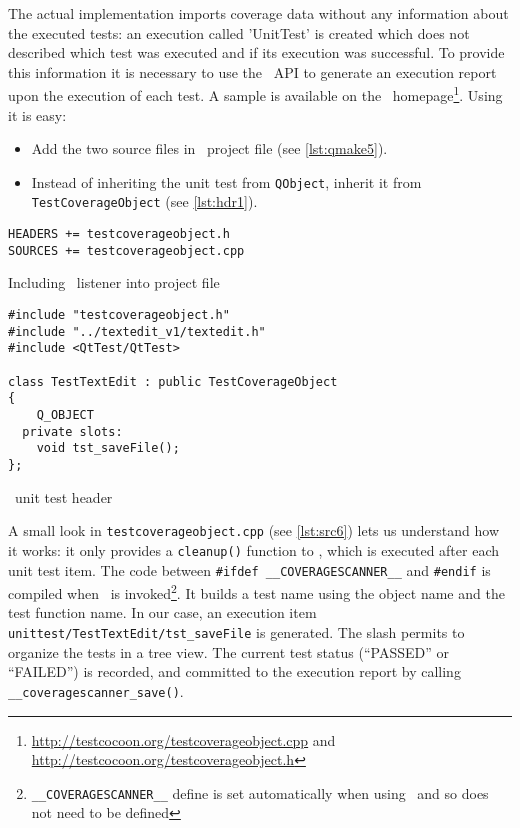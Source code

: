 The actual implementation imports coverage data without any information about
the executed tests: an execution called '\textsf{UnitTest}' is created which does
not described which test was executed and if its execution was successful.
To provide this information it is necessary to use the \CoverageScanner\ API to
generate an execution report upon the execution of each test. A sample is
available on the \TestCocoon\
homepage\footnote{\url{http://testcocoon.org/testcoverageobject.cpp} and
\url{http://testcocoon.org/testcoverageobject.h}}. Using it is easy: 
\begin{itemize}
  \item Add the two source files in \qmake\ project file (see \autoref{lst:qmake5}).
  \item Instead of inheriting the unit test from \texttt{QObject}, inherit it
    from \texttt{TestCoverageObject} (see \autoref{lst:hdr1}).
\end{itemize}

\begin{listings}[H]
  \scriptsize
\begin{verbatim}
HEADERS += testcoverageobject.h
SOURCES += testcoverageobject.cpp
\end{verbatim}
\caption{Including \CoverageScanner\ listener into {\qmake} project file}
\label{lst:qmake5}
\end{listings}

\begin{listings}[H]
  \scriptsize
\begin{verbatim}
#include "testcoverageobject.h"
#include "../textedit_v1/textedit.h"
#include <QtTest/QtTest>

class TestTextEdit : public TestCoverageObject
{
    Q_OBJECT
  private slots:
    void tst_saveFile();
};
\end{verbatim}
\caption{\TextEdit\ unit test header}
\label{lst:hdr1}
\end{listings}

A small look in \texttt{testcoverageobject.cpp} (see \autoref{lst:src6}) lets
us understand how it works: it only provides a \verb$cleanup()$ function to
\QTestLib, which is executed after each unit test item.
The code between \verb$#ifdef __COVERAGESCANNER__$ and \verb$#endif$ is 
compiled when \CoverageScanner\ is invoked\footnote{\texttt{\_\_COVERAGESCANNER\_\_} define
is set automatically when using \CoverageScanner\ and so does not need to be
defined}. It builds a test name using the object name and the test function
name. In our case, an execution item \verb$unittest/TestTextEdit/tst_saveFile$
is generated. The slash permits to organize the tests in a tree view.
The current test status (``PASSED'' or ``FAILED'') is recorded, and
committed to the execution report by calling \verb$__coveragescanner_save()$.


